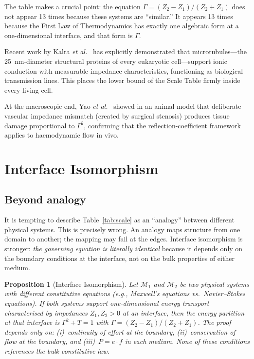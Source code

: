 \documentclass[aps,pre,twocolumn,superscriptaddress,floatfix]{revtex4-2}
\newtheorem{proposition}{Proposition}
\begin{document}
The table makes a crucial point:
the equation $\Gamma=(Z_2-Z_1)/(Z_2+Z_1)$ does not appear
13 times because these systems are ``similar.''
It appears 13 times because the First Law of Thermodynamics
has exactly one algebraic form at a one-dimensional interface,
and that form is $\Gamma$.

Recent work by Kalra \emph{et al.}~\cite{Kalra2025} has
explicitly demonstrated that microtubules---the
\SI{25}{nm}-diameter structural proteins of every eukaryotic
cell---support ionic conduction with measurable impedance
characteristics, functioning as biological transmission
lines.  This places the lower bound of the Scale Table
firmly inside every living cell.

At the macroscopic end, Yao \emph{et al.}~\cite{Yao2019}
showed in an animal model that deliberate vascular impedance
mismatch (created by surgical stenosis) produces tissue
damage proportional to $\Gamma^2$, confirming that the
reflection-coefficient framework applies to haemodynamic
flow in vivo.


\section{Interface Isomorphism}
\label{sec:isomorphism}

\subsection{Beyond analogy}

It is tempting to describe Table~\ref{tab:scale} as an
``analogy'' between different physical systems.
This is precisely wrong.
An analogy maps structure from one domain to another;
the mapping may fail at the edges.
Interface isomorphism is stronger:
\emph{the governing equation is literally identical}
because it depends only on the boundary conditions at the
interface, not on the bulk properties of either medium.

\begin{proposition}[Interface Isomorphism]
\label{prop:isomorphism}
Let $\mathcal{M}_1$ and $\mathcal{M}_2$ be two physical
systems with different constitutive equations (e.g.,
Maxwell's equations vs.\ Navier--Stokes equations).
If both systems support one-dimensional energy transport
characterised by impedances $Z_1, Z_2 > 0$ at an interface,
then the energy partition at that interface is
$\Gamma^2 + T = 1$ with $\Gamma=(Z_2-Z_1)/(Z_2+Z_1)$.
The proof depends only on:
(i)~continuity of effort at the boundary,
(ii)~conservation of flow at the boundary, and
(iii)~$P = e \cdot f$ in each medium.
None of these conditions references the bulk constitutive law.
\end{proposition}
\end{document}
